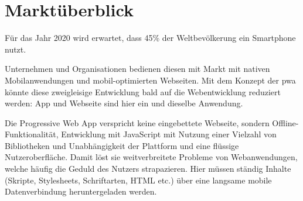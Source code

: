 \section{Marktüberblick}

Für das Jahr 2020 wird erwartet, dass 45\% der Weltbevölkerung ein Smartphone nutzt.
\cite{StatistaSmartphonesWorldwide}
\cite{StatistaWorldPopulation}

Unternehmen und Organisationen bedienen diesen mit Markt mit nativen Mobilanwendungen und mobil-optimierten Webseiten.
Mit dem Konzept der \ac{pwa} könnte diese zweigleisige Entwicklung bald auf die Webentwicklung reduziert werden: App und Webseite sind hier ein und dieselbe Anwendung. 


Die Progressive Web App verspricht keine eingebettete Webseite, sondern Offline-Funktionalität, Entwicklung mit JavaScript mit Nutzung einer Vielzahl von Bibliotheken und Unabhängigkeit der Plattform und eine flüssige Nutzeroberfläche. Damit löst sie weitverbreitete Probleme von Webanwendungen, welche häufig die Geduld des Nutzers strapazieren. Hier müssen ständig Inhalte (Skripte, Stylesheets, Schriftarten, HTML etc.) über eine langsame mobile Datenverbindung heruntergeladen werden.

